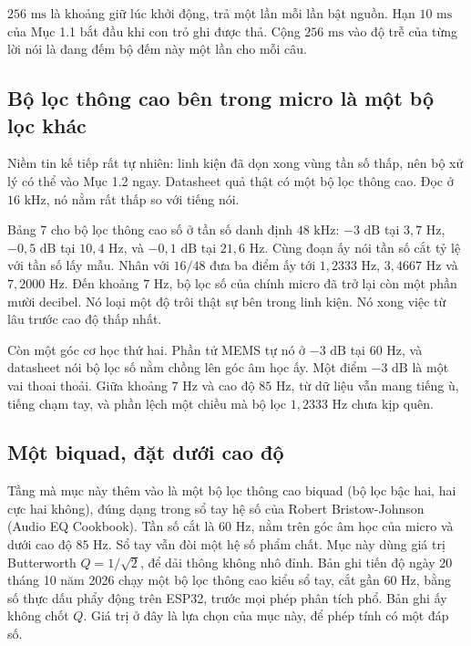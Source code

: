\documentclass[11pt,a4paper]{article}
\begin{document}
\begin{physicalinsight}
$256\text{ ms}$ là khoảng giữ lúc khởi động, trả một lần mỗi lần bật nguồn. Hạn $10\text{ ms}$ của Mục 1.1 bắt đầu khi con trỏ ghi được thả. Cộng $256\text{ ms}$ vào độ trễ của từng lời nói là đang đếm bộ đếm này một lần cho mỗi câu.
\end{physicalinsight}

\subsection*{Bộ lọc thông cao bên trong micro là một bộ lọc khác}

Niềm tin kế tiếp rất tự nhiên: linh kiện đã dọn xong vùng tần số thấp, nên bộ xử lý có thể vào Mục 1.2 ngay. Datasheet quả thật có một bộ lọc thông cao. Đọc ở $16\text{ kHz}$, nó nằm rất thấp so với tiếng nói.

Bảng 7 cho bộ lọc thông cao số ở tần số danh định $48\text{ kHz}$: $-3\text{ dB}$ tại $3{,}7\text{ Hz}$, $-0{,}5\text{ dB}$ tại $10{,}4\text{ Hz}$, và $-0{,}1\text{ dB}$ tại $21{,}6\text{ Hz}$. Cùng đoạn ấy nói tần số cắt tỷ lệ với tần số lấy mẫu. Nhân với $16/48$ đưa ba điểm ấy tới $1{,}2333\text{ Hz}$, $3{,}4667\text{ Hz}$ và $7{,}2000\text{ Hz}$. Đến khoảng $7\text{ Hz}$, bộ lọc số của chính micro đã trở lại còn một phần mười decibel. Nó loại một độ trôi thật sự bên trong linh kiện. Nó xong việc từ lâu trước cao độ thấp nhất.

Còn một góc cơ học thứ hai. Phần tử MEMS tự nó ở $-3\text{ dB}$ tại $60\text{ Hz}$, và datasheet nói bộ lọc số nằm chồng lên góc âm học ấy. Một điểm $-3\text{ dB}$ là một vai thoai thoải. Giữa khoảng $7\text{ Hz}$ và cao độ $85\text{ Hz}$, từ dữ liệu vẫn mang tiếng ù, tiếng chạm tay, và phần lệch một chiều mà bộ lọc $1{,}2333\text{ Hz}$ chưa kịp quên.

\subsection*{Một biquad, đặt dưới cao độ}

Tầng mà mục này thêm vào là một bộ lọc thông cao biquad (bộ lọc bậc hai, hai cực hai không), đúng dạng trong sổ tay hệ số của Robert Bristow-Johnson (Audio EQ Cookbook). Tần số cắt là $60\text{ Hz}$, nằm trên góc âm học của micro và dưới cao độ $85\text{ Hz}$. Sổ tay vẫn đòi một hệ số phẩm chất. Mục này dùng giá trị Butterworth $Q = 1/\sqrt{2}$, để dải thông không nhô đỉnh. Bản ghi tiến độ ngày 20 tháng 10 năm 2026 chạy một bộ lọc thông cao kiểu sổ tay, cắt gần $60\text{ Hz}$, bằng số thực dấu phẩy động trên ESP32, trước mọi phép phân tích phổ. Bản ghi ấy không chốt $Q$. Giá trị ở đây là lựa chọn của mục này, để phép tính có một đáp số.
\end{document}
